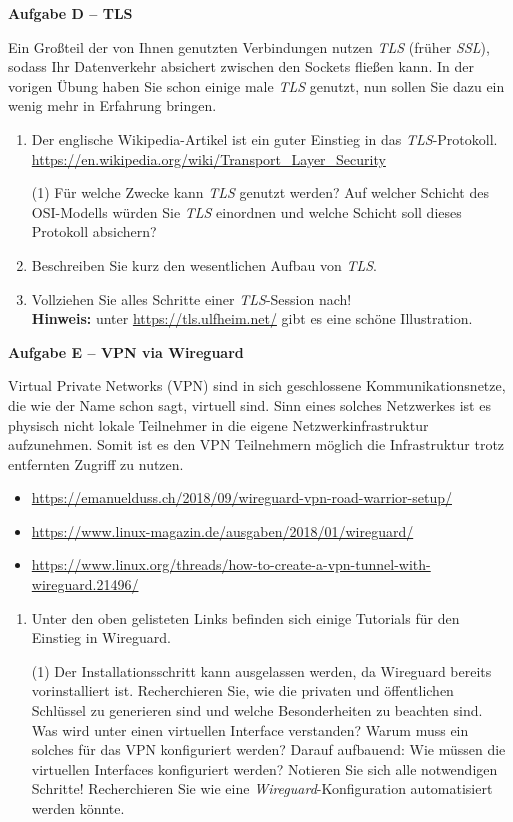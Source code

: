 \documentclass[paper=a4,fontsize=11pt]{scrartcl}%
\begin{document}
\begin{center}\Large{\textbf{Aufgabe D -- TLS}}\end{center}\vskip0.25in
Ein Großteil der von Ihnen genutzten Verbindungen nutzen \emph{TLS} (früher \emph{SSL}), sodass Ihr Datenverkehr absichert zwischen den Sockets fließen kann. In der vorigen Übung haben Sie schon einige male \emph{TLS} genutzt, nun sollen Sie dazu ein wenig mehr in Erfahrung bringen.
\begin{enumerate}
	\item Der englische Wikipedia-Artikel ist ein guter Einstieg in das \emph{TLS}-Protokoll.\\
	\url{https://en.wikipedia.org/wiki/Transport_Layer_Security}
	\begin{tasks}(1)
		\task Für welche Zwecke kann \emph{TLS} genutzt werden?
		\task Auf welcher Schicht des OSI-Modells würden Sie \emph{TLS} einordnen und welche Schicht soll dieses Protokoll absichern?
	\end{tasks}
	\item Beschreiben Sie kurz den wesentlichen Aufbau von \emph{TLS}.
	\item Vollziehen Sie alles Schritte einer \emph{TLS}-Session nach!\\
	\textbf{Hinweis:} unter \url{https://tls.ulfheim.net/} gibt es eine schöne Illustration.
\end{enumerate}

\begin{center}\Large{\textbf{Aufgabe E -- VPN via Wireguard}}\end{center}\vskip0.25in
Virtual Private Networks (VPN) sind in sich geschlossene Kommunikationsnetze, die wie der Name schon sagt, virtuell sind. Sinn eines solches Netzwerkes ist es physisch nicht lokale Teilnehmer in die eigene Netzwerkinfrastruktur aufzunehmen. Somit ist es den VPN Teilnehmern möglich die Infrastruktur trotz entfernten Zugriff zu nutzen.
\begin{itemize}
	\item \url{https://emanuelduss.ch/2018/09/wireguard-vpn-road-warrior-setup/}
	\item \url{https://www.linux-magazin.de/ausgaben/2018/01/wireguard/}
	\item \url{https://www.linux.org/threads/how-to-create-a-vpn-tunnel-with-wireguard.21496/}
\end{itemize}
\begin{enumerate}
	\item Unter den oben gelisteten Links befinden sich einige Tutorials für den Einstieg in Wireguard.
	\begin{tasks}(1)
		\task Der Installationsschritt kann ausgelassen werden, da Wireguard bereits vorinstalliert ist.
		\task Recherchieren Sie, wie die privaten und öffentlichen Schlüssel zu generieren sind und welche Besonderheiten zu beachten sind.
		\task Was wird unter einen virtuellen Interface verstanden? Warum muss ein solches für das VPN konfiguriert werden?
		\task Darauf aufbauend: Wie müssen die virtuellen Interfaces konfiguriert werden? Notieren Sie sich alle notwendigen Schritte!
		\task Recherchieren Sie wie eine \emph{Wireguard}-Konfiguration automatisiert werden könnte.
	\end{tasks}
\end{enumerate}
\end{document}
